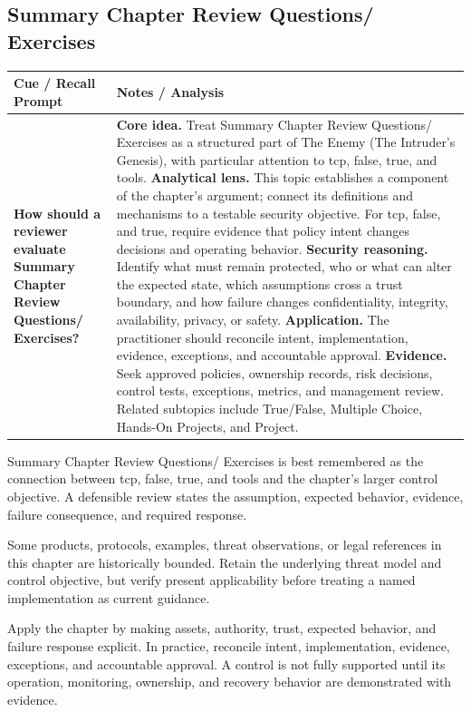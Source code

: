 \documentclass[11pt]{article}
\newcommand{\CornellHeader}{%
\rowcolor{Navy}\color{white}\bfseries Cue / Recall Prompt & \color{white}\bfseries Notes / Analysis\\\hline}
\newcommand{\CornellRow}[2]{%
\cellcolor{CueGray}\RaggedRight\textbf{#1} & \RaggedRight #2\\\hline}
\begin{document}
\subsection*{Summary Chapter Review Questions/ Exercises}
\begin{longtable}{>{\RaggedRight\arraybackslash}p{}|>{\RaggedRight\arraybackslash}p{}}
\CornellHeader
\CornellRow{How should a reviewer evaluate Summary Chapter Review Questions/ Exercises?}{\textbf{Core idea.} Treat Summary Chapter Review Questions/ Exercises as a structured part of The Enemy (The Intruder's Genesis), with particular attention to tcp, false, true, and tools. \textbf{Analytical lens.} This topic establishes a component of the chapter's argument; connect its definitions and mechanisms to a testable security objective. For tcp, false, and true, require evidence that policy intent changes decisions and operating behavior. \textbf{Security reasoning.} Identify what must remain protected, who or what can alter the expected state, which assumptions cross a trust boundary, and how failure changes confidentiality, integrity, availability, privacy, or safety. \textbf{Application.} The practitioner should reconcile intent, implementation, evidence, exceptions, and accountable approval. \textbf{Evidence.} Seek approved policies, ownership records, risk decisions, control tests, exceptions, metrics, and management review. Related subtopics include True/False, Multiple Choice, Hands-On Projects, and Project.}
\end{longtable}
\begin{topicsummary}
Summary Chapter Review Questions/ Exercises is best remembered as the connection between tcp, false, true, and tools and the chapter's larger control objective. A defensible review states the assumption, expected behavior, evidence, failure consequence, and required response.
\end{topicsummary}
\begin{historybox}
Some products, protocols, examples, threat observations, or legal references in this chapter are historically bounded. Retain the underlying threat model and control objective, but verify present applicability before treating a named implementation as current guidance.
\end{historybox}
\begin{defensebox}
Apply the chapter by making assets, authority, trust, expected behavior, and failure response explicit. In practice, reconcile intent, implementation, evidence, exceptions, and accountable approval. A control is not fully supported until its operation, monitoring, ownership, and recovery behavior are demonstrated with evidence.
\end{defensebox}
\end{document}
